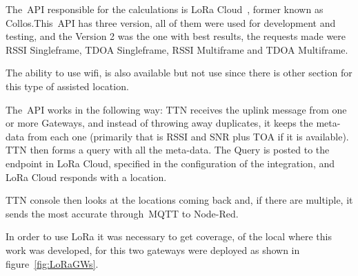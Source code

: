 The~\gls{API} responsible for the calculations is LoRa Cloud~\cite{LoRACloud}, former known as Collos.This~\gls{API} has three version, all of them were used for development and testing, and the Version 2 was the one with best results, the requests made were RSSI Singleframe, TDOA Singleframe, RSSI Multiframe and TDOA Multiframe. 

The ability to use wifi, is also available but not use since there is other section for this type of assisted location. 

The~\gls{API} works in the following way: TTN receives the uplink message from one or more Gateways, and instead of throwing away duplicates, it keeps the meta-data from each one (primarily that is RSSI and SNR plus TOA if it is available).
TTN then forms a query with all the meta-data. The Query is posted to the endpoint in LoRa Cloud, specified in the configuration of the integration, and LoRa Cloud responds with a location.

TTN console then looks at the locations coming back and, if there are multiple, it sends the most accurate through~\gls{MQTT} to Node-Red.

In order to use LoRa it was necessary to get coverage, of the local where this work was developed, for this two gateways were deployed as shown in figure~\ref{fig:LoRaGWs}.



